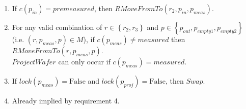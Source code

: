 \begin{enumerate}
    \item If $c(p_\mathit{in}) = \mathit{premeasured}$, then $\mathit{RMoveFromTo(r_2, p_\mathit{in}, p_\mathit{meas})}$. %

    \item For any valid combination of $r \in \left\{r_2, r_3\right\}$ and $p \in \left\{p_\mathit{out}, p_\mathit{empty1}, p_\mathit{empty2}\right\}$ (i.e. $\left(r, p_\mathit{meas}, p\right) \in M$), if $c(p_\mathit{meas}) \ne \mathit{measured}$ then $\mathit{RMoveFromTo}(r, p_\mathit{meas}, p)$. \\
    $\mathit{ProjectWafer}$ can only occur if $c(p_\mathit{meas}) = \mathit{measured}$. %

    \item If $\mathit{lock}(p_\mathit{meas}) = \text{False}$ and $\mathit{lock}(p_\mathit{proj}) = \text{False}$, then $\mathit{Swap}$. %

    \item Already implied by requirement 4. %


\end{enumerate}
